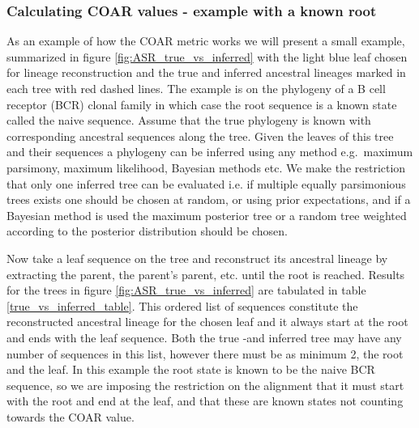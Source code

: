 \subsubsection{Calculating COAR values - example with a known root}
As an example of how the COAR metric works we will present a small example, summarized in figure \ref{fig:ASR_true_vs_inferred} with the light blue leaf chosen for lineage reconstruction and the true and inferred ancestral lineages marked in each tree with red dashed lines.
The example is on the phylogeny of a B cell receptor (BCR) clonal family in which case the root sequence is a known state called the naive sequence.
Assume that the true phylogeny is known with corresponding ancestral sequences along the tree.
Given the leaves of this tree and their sequences a phylogeny can be inferred using any method e.g.\ maximum parsimony, maximum likelihood, Bayesian methods etc.
We make the restriction that only one inferred tree can be evaluated i.e. if multiple equally parsimonious trees exists one should be chosen at random, or using prior expectations, and if a Bayesian method is used the maximum posterior tree or a random tree weighted according to the posterior distribution should be chosen.


Now take a leaf sequence on the tree and reconstruct its ancestral lineage by extracting the parent, the parent's parent, etc. until the root is reached.
Results for the trees in figure \ref{fig:ASR_true_vs_inferred} are tabulated in table \ref{true_vs_inferred_table}.
This ordered list of sequences constitute the reconstructed ancestral lineage for the chosen leaf and it always start at the root and ends with the leaf sequence.
Both the true -and inferred tree may have any number of sequences in this list, however there must be as minimum 2, the root and the leaf.
In this example the root state is known to be the naive BCR sequence, so we are imposing the restriction on the alignment that it must start with the root and end at the leaf, and that these are known states not counting towards the COAR value.

